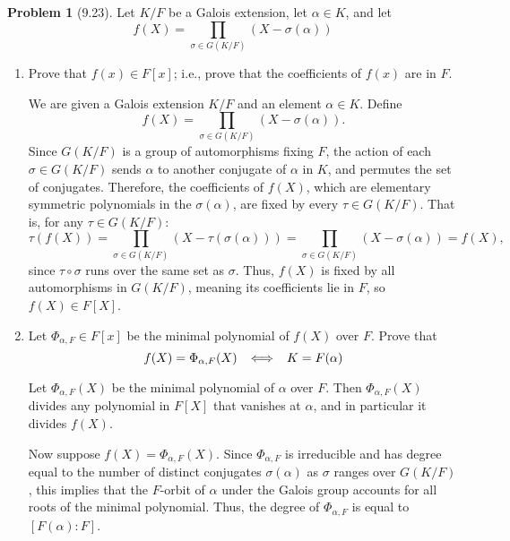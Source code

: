 \documentclass[12pt]{article}
\theoremstyle{definition}
\newtheorem{problem}{Problem}
\begin{document}
\begin{problem}[9.23]
    Let $K/F$ be a Galois extension, let $\alpha \in K$, and let
    \[
        f(X) = \prod_{\sigma \in G(K/F)} (X - \sigma(\alpha))
    \]
    \begin{enumerate}[label=(\alph*)]
        \item Prove that $f(x) \in F[x]$; i.e., prove that the coefficients of $f(x)$ are in $F$.
        
        \begin{solution}
            We are given a Galois extension $K/F$ and an element $\alpha \in K$. Define
            \[
            f(X) = \prod_{\sigma \in G(K/F)} (X - \sigma(\alpha)).
            \]
            Since $G(K/F)$ is a group of automorphisms fixing $F$, the action of each $\sigma \in G(K/F)$ sends $\alpha$ to another conjugate of $\alpha$ in $K$, and permutes the set of conjugates. Therefore, the coefficients of $f(X)$, which are elementary symmetric polynomials in the $\sigma(\alpha)$, are fixed by every $\tau \in G(K/F)$. That is, for any $\tau \in G(K/F)$:
            \[
            \tau(f(X)) = \prod_{\sigma \in G(K/F)} (X - \tau(\sigma(\alpha))) = \prod_{\sigma \in G(K/F)} (X - \sigma(\alpha)) = f(X),
            \]
            since $\tau \circ \sigma$ runs over the same set as $\sigma$. Thus, $f(X)$ is fixed by all automorphisms in $G(K/F)$, meaning its coefficients lie in $F$, so $f(X) \in F[X]$.

        \end{solution}

        \item Let $\Phi_{\alpha, F} \in F[x]$ be the minimal polynomial of $f(X)$ over $F$. Prove that
              \[ 
                f(X) = \Phi_{\alpha, F}(X) \hspace{5px} \iff \hspace{5px} K = F(\alpha) 
              \]
        \begin{solution}
            Let $\Phi_{\alpha, F}(X)$ be the minimal polynomial of $\alpha$ over $F$. Then $\Phi_{\alpha, F}(X)$ divides any polynomial in $F[X]$ that vanishes at $\alpha$, and in particular it divides $f(X)$. 

            Now suppose $f(X) = \Phi_{\alpha, F}(X)$. Since $\Phi_{\alpha, F}$ is irreducible and has degree equal to the number of distinct conjugates $\sigma(\alpha)$ as $\sigma$ ranges over $G(K/F)$, this implies that the $F$-orbit of $\alpha$ under the Galois group accounts for all roots of the minimal polynomial. Thus, the degree of $\Phi_{\alpha, F}$ is equal to $[F(\alpha):F]$.
            

\end{solution}
\end{enumerate}
\end{problem}
\end{document}
